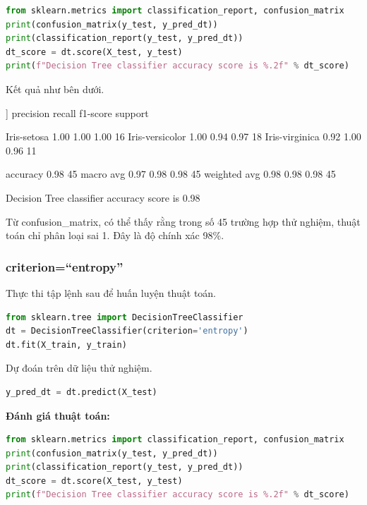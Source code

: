 \begin{lstlisting}[language=Python]
from sklearn.metrics import classification_report, confusion_matrix
print(confusion_matrix(y_test, y_pred_dt))
print(classification_report(y_test, y_pred_dt))
dt_score = dt.score(X_test, y_test)
print(f"Decision Tree classifier accuracy score is %.2f" % dt_score)
\end{lstlisting}

Kết quả như bên dưới.

\begin{terminal}
[[16  0  0]
[ 0 17  1]
[ 0  0 11]]
                 precision    recall  f1-score   support

    Iris-setosa       1.00      1.00      1.00        16
Iris-versicolor       1.00      0.94      0.97        18
 Iris-virginica       0.92      1.00      0.96        11

       accuracy                           0.98        45
      macro avg       0.97      0.98      0.98        45
   weighted avg       0.98      0.98      0.98        45

Decision Tree classifier accuracy score is 0.98
\end{terminal}

Từ confusion\_matrix, có thể thấy rằng trong số 45 trường hợp
thử nghiệm, thuật toán chỉ phân loại sai 1. Đây là độ chính xác 98\%.

\subsubsection{criterion=\enquote{entropy}}
Thực thi tập lệnh sau để huấn luyện thuật toán.

\begin{lstlisting}[language=Python]
from sklearn.tree import DecisionTreeClassifier
dt = DecisionTreeClassifier(criterion='entropy')
dt.fit(X_train, y_train)
\end{lstlisting}

Dự đoán trên dữ liệu thử nghiệm.

\begin{lstlisting}[language=Python]
y_pred_dt = dt.predict(X_test)
\end{lstlisting}

\textbf{Đánh giá thuật toán:}

\begin{lstlisting}[language=Python]
from sklearn.metrics import classification_report, confusion_matrix
print(confusion_matrix(y_test, y_pred_dt))
print(classification_report(y_test, y_pred_dt))
dt_score = dt.score(X_test, y_test)
print(f"Decision Tree classifier accuracy score is %.2f" % dt_score)
\end{lstlisting}

